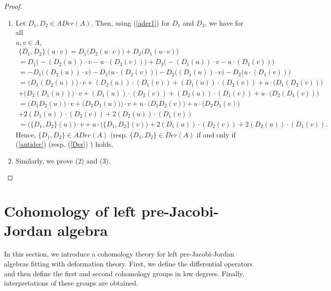 \documentclass[12pt]{amsart}
\begin{document}
	\begin{proof}
		\begin{enumerate}
			\item 	Let $D_1,D_2\in ADer(A).$ Then, using (\ref{ader1}) for $D_1$ and $D_2$, we have for all \\ 
			$u,v\in A$,\\
			$\begin{array}{lll}
				\{D_1,D_2\}(u\cdot v)=D_{1}\bigg(D_{2}(u\cdot v)\bigg)+D_{2}\bigg(D_{1}(u\cdot v)\bigg)\\
				=D_{1}\bigg(-(D_{2}(u))\cdot v-u\cdot(D_{2}(v))\bigg)+D_{2}\bigg(-(D_{1}(u))\cdot v-u\cdot(D_{1}(v))\bigg)\\
				=-D_{1}\bigg((D_{2}(u))\cdot v\bigg)-D_{1}\bigg(u\cdot(D_{2}(v)) \bigg)-
				D_{2}\bigg((D_{1}(u))\cdot v\bigg)-D_{2}\bigg(u\cdot(D_{1}(v)) \bigg)\\
				=\bigg(D_{1}(D_{2}(u))\bigg)\cdot v+(D_{2}(u))\cdot(D_{1}(v))+(D_{1}(u))\cdot(D_{2}(v))+u\cdot\bigg(D_{1}(D_{2}(v))\bigg)
				\\+
				\bigg(D_{2}(D_{1}(u))\bigg)\cdot v+(D_{1}(u))\cdot(D_{2}(v))+(D_{2}(u))\cdot(D_{1}(v))+u\cdot\bigg(D_{2}(D_{1}(v))\bigg)\\
				=\bigg(D_{1}D_{2}(u)\bigg)\cdot v+\bigg(D_{2}D_{1}(u))\bigg)\cdot v+u\cdot\bigg(D_{1}D_{2}(v)\bigg)+u\cdot\bigg(D_{2}D_{1}(v)\bigg)\\
				+2(D_{1}(u))\cdot(D_{2}(v))+2(D_{2}(u))\cdot(D_{1}(v))\\
				=\bigg(\{D_{1},D_{2}\}(u)\bigg)\cdot v+u\cdot\bigg(\{D_{1},D_{2}\}(v)\bigg)+2(D_{1}(u))\cdot(D_{2}(v))+2(D_{2}(u))\cdot(D_{1}(v)).
			\end{array}  $\\
			Hence, $\{D_1,D_2\}\in ADer(A)$ (resp. $\{D_1,D_2\}\in Der(A)$ if and only if  (\ref{antider}) (resp. (\ref{Der}) ) holds.
			\item  Similarly, we prove (2) and (3).
		\end{enumerate}	
	\end{proof}
	\section{Cohomology of left pre-Jacobi-Jordan algebra}
	In this section, we introduce a cohomology theory for left pre-Jacobi-Jordan algebras fitting with deformation theory. First, we define the differential operators and then define the first and second cohomology groups in low degrees. Finally, interpretations of these groups are obtained.
\end{document}
